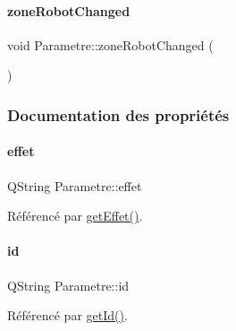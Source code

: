 \mbox{\label{class_parametre_a770fb72eb2727da9f823aba5524a903e}} 
\paragraph{\texorpdfstring{zone\+Robot\+Changed}{zoneRobotChanged}}
{\footnotesize\ttfamily void Parametre\+::zone\+Robot\+Changed (\begin{DoxyParamCaption}{ }\end{DoxyParamCaption})\hspace{0.3cm}{\ttfamily [signal]}}



\subsubsection{Documentation des propriétés}
\mbox{\label{class_parametre_a1ac07f14fbc50b243b57246f662fe67f}} 
\paragraph{\texorpdfstring{effet}{effet}}
{\footnotesize\ttfamily Q\+String Parametre\+::effet\hspace{0.3cm}{\ttfamily [read]}}



Référencé par \hyperlink{class_parametre_aa256fc71d142a9a9cfeab2d2686f0d9d}{get\+Effet()}.

\mbox{\label{class_parametre_aa60cee81cf82cba4c7b216f15adf8a80}} 
\paragraph{\texorpdfstring{id}{id}}
{\footnotesize\ttfamily Q\+String Parametre\+::id\hspace{0.3cm}{\ttfamily [read]}}



Référencé par \hyperlink{class_parametre_a5831b57e743a12d6d1a8af98e9abcccb}{get\+Id()}.

\mbox{\label{class_parametre_a0423730a9146df04ba4de3f733818e45}} 
